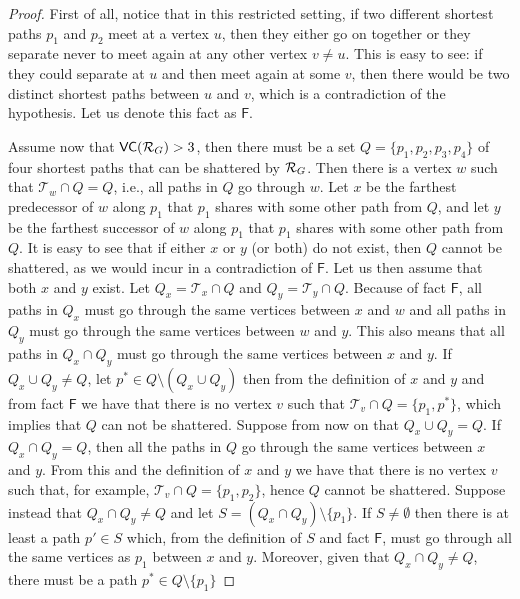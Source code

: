 \ifproof
\begin{proof}
  First of all, notice that in this restricted setting, if two different
  shortest paths $p_1$ and $p_2$ meet at a vertex $u$, then they either go on
  together or %
  they separate never to meet again at any other
  vertex $v\neq u$. This is easy to see: if they could separate at $u$ and then
  meet again at some $v$, then there would be two distinct shortest paths
  between $u$ and $v$, which is a contradiction of the hypothesis. Let us denote
  this fact as $\mathsf{F}$.

  Assume now that $\mathsf{VC}(\mathcal{R}_G)>3$, then there must be a set
  $Q=\{p_1,p_2,p_3,p_4\}$ of four shortest paths that can be shattered by
  $\mathcal{R}_G$. Then there is a vertex $w$ such that $\mathcal{T}_w\cap Q=Q$, i.e.,
  all paths in $Q$ go through $w$. Let $x$ be the farthest predecessor of $w$
  along $p_1$ that $p_1$ shares with some other path from $Q$, and let $y$ be
  the farthest successor of $w$ along $p_1$ that $p_1$ shares with some other
  path from $Q$. It is easy to see that if either $x$ or $y$ (or both) do not
  exist, then $Q$ cannot be shattered, as we would incur in a contradiction of
  $\mathsf{F}$. Let us then assume that both $x$ and $y$ exist.
  Let $Q_x=\mathcal{T}_x\cap Q$ and $Q_y=\mathcal{T}_y\cap Q$.
  Because of fact $\mathsf{F}$, all paths in $Q_x$ must go through the same vertices
  between $x$ and $w$ and all paths in $Q_y$ must go through the same vertices
  between $w$ and $y$. This also means that all paths in $Q_x\cap Q_y$ must go
  through the same vertices between $x$ and $y$. If $Q_x\cup Q_y\neq Q$, let
  $p^*\in Q\setminus(Q_x\cup Q_y)$ then from the definition of $x$ and $y$ and
  from fact $\mathsf{F}$ we have that there is no vertex $v$ such that
  $\mathcal{T}_v\cap Q=\{p_1,p^*\}$, which implies that $Q$ can not be
  shattered. Suppose from now on that $Q_x\cup Q_y=Q$.  If $Q_x\cap Q_y=Q$, then
  all the paths in $Q$ go through the same vertices between $x$ and $y$. From
  this and the definition of $x$ and $y$ we have that there is no vertex $v$
  such that, for example, $\mathcal{T}_v\cap Q=\{p_1,p_2\}$, hence $Q$ cannot be
  shattered. Suppose instead that $Q_x\cap Q_y\neq Q$ and let $S=(Q_x\cap
  Q_y)\setminus\{p_1\}$. If $S\neq\emptyset$ then there is at least a path
  $p'\in S$ which, from the definition of $S$ and fact $\mathsf{F}$, must go
  through all the same vertices as $p_1$ between $x$ and $y$. Moreover, given
  that $Q_x\cap Q_y\neq Q$, there must be a path $p^*\in Q\setminus\{p_1\}$

\end{proof}
